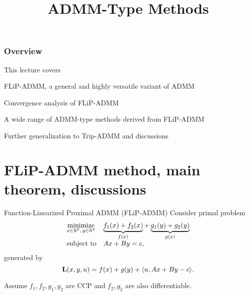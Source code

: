 \documentclass[10pt,mathserif]{beamer}
\title{\large \bfseries ADMM-Type Methods}
\begin{document}
\frame{
\thispagestyle{empty}
\titlepage
}

\begin{frame}
\frametitle{Overview}

This lecture covers
\smallskip
\begin{witemize}
  \item FLiP-ADMM, a general and highly versatile variant of ADMM
  \item Convergence analysis of FLiP-ADMM
  \item A wide range of ADMM-type methods derived from FLiP-ADMM
  \item Further generalization to Trip-ADMM and discussions
\end{witemize}
\end{frame}

\section{FLiP-ADMM method, main theorem, discussions}

\begin{frame}{Function-Linearized Proximal ADMM (FLiP-ADMM)}
Consider primal problem
\begin{equation}\label{eq:FlpADMM}
\begin{array}{ll}
\underset{\substack{x\in \mathbb{R}^p,\,y\in \mathbb{R}^q}}{\mbox{minimize}}&\underbrace{f_1(x)+f_2(x)}_{f(x)}+\underbrace{g_1(y)+g_2(y)}_{g(x)}\\
\mbox{subject to}&Ax+By=c,
\end{array}
\end{equation}
generated by 
\[
\mathbf{L}(x,y,u )=f(x)+g(y)+\langle u , Ax+By-c\rangle.
\]

Assume $f_1,f_2,g_1,g_2$ are CCP and $f_2,g_2$ are also differentiable.

\end{frame}
\end{document}
